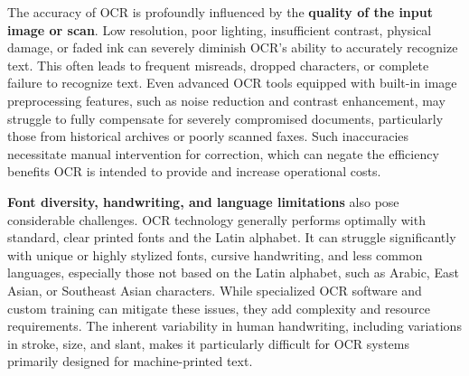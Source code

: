 The accuracy of OCR is profoundly influenced by the \textbf{quality of the input image or scan}. Low resolution, poor lighting, insufficient contrast, physical damage, or faded ink can severely diminish OCR's ability to accurately recognize text. This often leads to frequent misreads, dropped characters, or complete failure to recognize text. Even advanced OCR tools equipped with built-in image preprocessing features, such as noise reduction and contrast enhancement, may struggle to fully compensate for severely compromised documents, particularly those from historical archives or poorly scanned faxes. Such inaccuracies necessitate manual intervention for correction, which can negate the efficiency benefits OCR is intended to provide and increase operational costs.

\textbf{Font diversity, handwriting, and language limitations} also pose considerable challenges. OCR technology generally performs optimally with standard, clear printed fonts and the Latin alphabet. It can struggle significantly with unique or highly stylized fonts, cursive handwriting, and less common languages, especially those not based on the Latin alphabet, such as Arabic, East Asian, or Southeast Asian characters. While specialized OCR software and custom training can mitigate these issues, they add complexity and resource requirements. The inherent variability in human handwriting, including variations in stroke, size, and slant, makes it particularly difficult for OCR systems primarily designed for machine-printed text.

